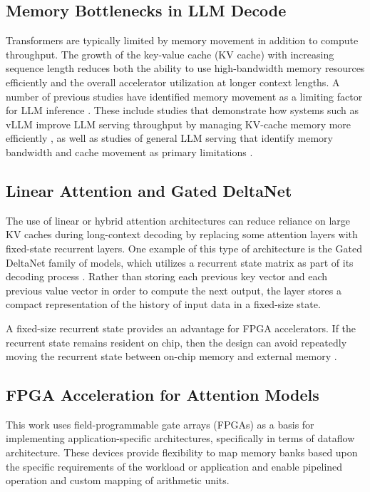 \documentclass[conference]{IEEEtran}
\begin{document}
\subsection{Memory Bottlenecks in LLM Decode}
Transformers are typically limited by memory movement in addition to compute throughput. The growth of the key-value cache (KV cache) with increasing sequence length reduces both the ability to use high-bandwidth memory resources efficiently and the overall accelerator utilization at longer context lengths. A number of previous studies have identified memory movement as a limiting factor for LLM inference \cite{b1,b4,b7}. These include studies that demonstrate how systems such as vLLM improve LLM serving throughput by managing KV-cache memory more efficiently \cite{b4}, as well as studies of general LLM serving that identify memory bandwidth and cache movement as primary limitations \cite{b1,b7}.

\subsection{Linear Attention and Gated DeltaNet}
The use of linear or hybrid attention architectures can reduce reliance on large KV caches during long-context decoding by replacing some attention layers with fixed-state recurrent layers. One example of this type of architecture is the Gated DeltaNet family of models, which utilizes a recurrent state matrix as part of its decoding process \cite{b3}. Rather than storing each previous key vector and each previous value vector in order to compute the next output, the layer stores a compact representation of the history of input data in a fixed-size state.

A fixed-size recurrent state provides an advantage for FPGA accelerators. If the recurrent state remains resident on chip, then the design can avoid repeatedly moving the recurrent state between on-chip memory and external memory \cite{b10}.

\subsection{FPGA Acceleration for Attention Models}
This work uses field-programmable gate arrays (FPGAs) as a basis for implementing application-specific architectures, specifically in terms of dataflow architecture. These devices provide flexibility to map memory banks based upon the specific requirements of the workload or application and enable pipelined operation and custom mapping of arithmetic units.
\end{document}
